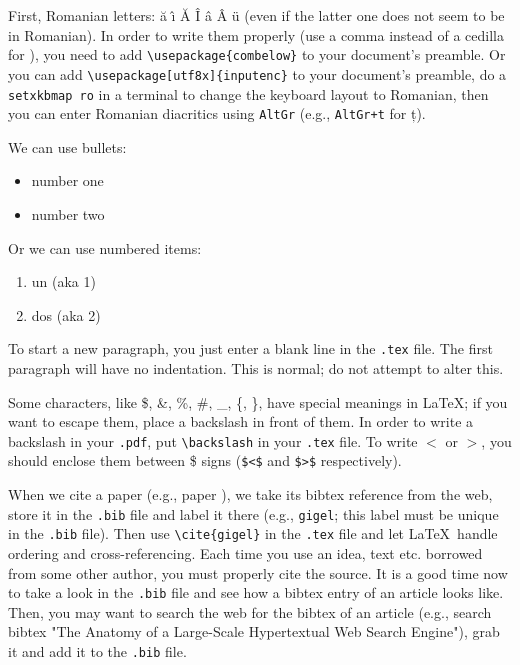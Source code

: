 \documentclass[11pt,a4paper,twoside,notitlepage]{article}
\begin{document}


First, Romanian letters:
\u{a} 
\^{\i}
\u{A} 
\^{I}
\^a 
\^A
\"{u} (even if the latter one does not seem to be in Romanian). 
In order to write them properly (use a comma instead of a cedilla for ), you need to add \verb|\usepackage{combelow}| to your document's preamble. 
Or you can add \verb|\usepackage[utf8x]{inputenc}| to your document's preamble, do a \verb|setxkbmap ro| in a terminal to change the keyboard layout 
to Romanian, then you can enter Romanian diacritics using \texttt{AltGr} (e.g., \texttt{AltGr+t} for ț). 

We can use bullets:
\begin{itemize}
    \item number one
    \item number two
\end{itemize}

Or we can use numbered items: 
\begin{enumerate}
    \item un (aka 1)
    \item dos (aka 2)
\end{enumerate}

To start a new paragraph, you just enter a blank line in the \texttt{.tex} file. The first paragraph will have no indentation. 
This is normal; do not attempt to alter this.

Some characters, like \$, \&, \%, \#, \_, \{, \}, have special meanings in \LaTeX; if you want to escape them, place a backslash in front of them. 
In order to write a backslash in your \texttt{.pdf}, put \verb|\backslash| in your \texttt{.tex} file. To write $<$ or $>$, you should enclose them 
between \$ signs (\verb|$<$| and \verb|$>$| respectively). 

When we cite a paper (e.g., paper \cite{Zhou04} %
), we take its bibtex reference from the web,
store it in the \texttt{.bib} file and label it there (e.g., \texttt{gigel}; this label must be unique in the \texttt{.bib} file).
Then use \verb|\cite{gigel}| in the \texttt{.tex} file and let \LaTeX\ handle ordering and cross-referencing. 
Each time you use an idea, text etc. borrowed from some other author, you must properly cite the source. 
It is a good time now to take a look in the \texttt{.bib} file and see how a bibtex entry of an article looks like.
Then, you may want to search the web for the bibtex of an article (e.g., search bibtex "The Anatomy of a Large-Scale Hypertextual Web Search Engine"), 
grab it and add it to the \texttt{.bib} file.
\end{document}
